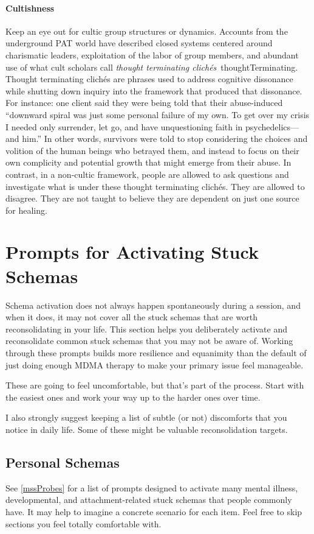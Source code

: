 \documentclass[11pt,oneside]{book}
\let\cite\parencite
\begin{document}
\subsubsection*{Cultishness}
Keep an eye out for cultic group structures or dynamics. Accounts from the underground PAT world have described closed systems centered around charismatic leaders, exploitation of the labor of group members, and abundant use of what cult scholars call \textit{thought terminating clichés}~\cite{hallMad}{thoughtTerminating}. Thought terminating clichés are phrases used to address cognitive dissonance while shutting down inquiry into the framework that produced that dissonance. For instance: one client said they were being told that their abuse-induced \enquote{downward spiral was just some personal failure of my own. To get over my crisis I needed only surrender, let go, and have unquestioning faith in psychedelics—and him.} In other words, survivors were told to stop considering the choices and volition of the human beings who betrayed them, and instead to focus on their own complicity and potential growth that might emerge from their abuse. In contrast, in a non-cultic framework, people are allowed to ask questions and investigate what is under these thought terminating clichés. They are allowed to disagree. They are not taught to believe they are dependent on just one source for healing.

\chapter{Prompts for Activating Stuck Schemas}
\label{mapping}
Schema activation does not always happen spontaneously during a session, and when it does, it may not cover all the stuck schemas that are worth reconsolidating in your life. This section helps you deliberately activate and reconsolidate common stuck schemas that you may not be aware of. Working through these prompts builds more resilience and equanimity than the default of just doing enough MDMA therapy to make your primary issue feel manageable.

These are going to feel uncomfortable, but that's part of the process. Start with the easiest ones and work your way up to the harder ones over time.

I also strongly suggest keeping a list of subtle (or not) discomforts that you notice in daily life. Some of these might be valuable reconsolidation targets.
\section{Personal Schemas}
See \cref{mssProbes} for a list of prompts designed to activate many mental illness, developmental, and attachment-related stuck schemas that people commonly have. It may help to imagine a concrete scenario for each item. Feel free to skip sections you feel totally comfortable with.
\end{document}
